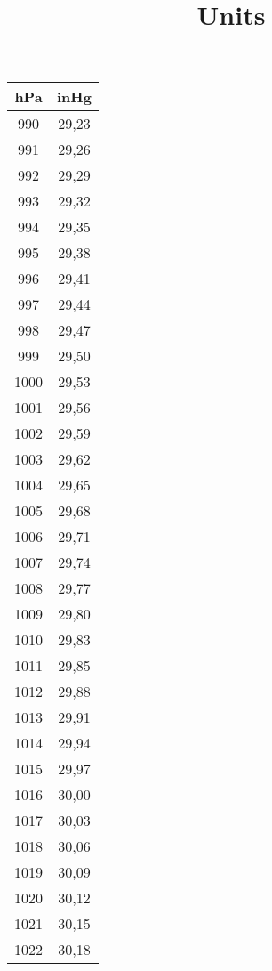 \documentclass[10pt]{article}
\begin{document}
\title{Units}

\begin{table}[!ht]
  \centering
  \tiny
  \begin{tabular}{|c|c|}
    \hline
    \cellcolor{black!90}\color{white}\textbf{hPa} & \cellcolor{black!90}\color{white}\textbf{inHg} \\ \hline
    990 & 29,23 \\ \hline
    991 & 29,26 \\ \hline
    992 & 29,29 \\ \hline
    993 & 29,32 \\ \hline
    994 & 29,35 \\ \hline
    995 & 29,38 \\ \hline
    996 & 29,41 \\ \hline
    997 & 29,44 \\ \hline
    998 & 29,47 \\ \hline
    999 & 29,50 \\ \hline
    1000 & 29,53 \\ \hline
    1001 & 29,56 \\ \hline
    1002 & 29,59 \\ \hline
    1003 & 29,62 \\ \hline
    1004 & 29,65 \\ \hline
    1005 & 29,68 \\ \hline
    1006 & 29,71 \\ \hline
    1007 & 29,74 \\ \hline
    1008 & 29,77 \\ \hline
    1009 & 29,80 \\ \hline
    1010 & 29,83 \\ \hline
    1011 & 29,85 \\ \hline
    1012 & 29,88 \\ \hline
    1013 & 29,91 \\ \hline
    1014 & 29,94 \\ \hline
    1015 & 29,97 \\ \hline
    1016 & 30,00 \\ \hline
    1017 & 30,03 \\ \hline
    1018 & 30,06 \\ \hline
    1019 & 30,09 \\ \hline
    1020 & 30,12 \\ \hline
    1021 & 30,15 \\ \hline
    1022 & 30,18 \\ \hline

\end{tabular}
\end{table}
\end{document}
